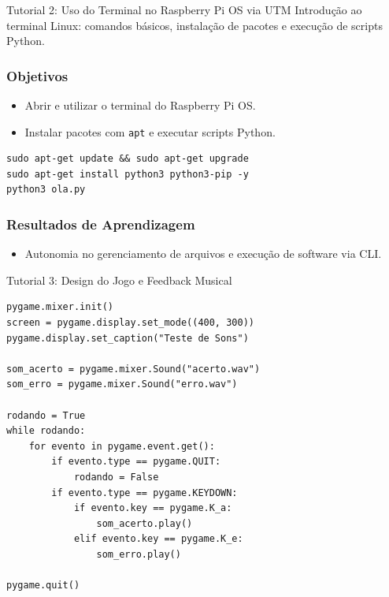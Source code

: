 \documentclass[11pt,a4paper]{article}
\begin{document}
    
\newpage  
\begin{boxTutorial}{Tutorial 2: Uso do Terminal no Raspberry Pi OS via UTM}
    \label{sec: Etapa 2: Uso do Terminal no Raspberry Pi OS via UTM}
        Introdução ao terminal Linux: comandos básicos, instalação de pacotes e execução de scripts Python.
        
        \subsubsection*{Objetivos}
        \begin{itemize}
            \item Abrir e utilizar o terminal do Raspberry Pi OS.
            \item Instalar pacotes com \texttt{apt} e executar scripts Python.
        \end{itemize}
        
    \begin{verbatim}
sudo apt-get update && sudo apt-get upgrade
sudo apt-get install python3 python3-pip -y
python3 ola.py
    \end{verbatim}
        
        \subsubsection*{Resultados de Aprendizagem}
        \begin{itemize}
            \item Autonomia no gerenciamento de arquivos e execução de software via CLI.
        \end{itemize}
\end{boxTutorial}
    

\newpage

\begin{boxTutorial}{Tutorial 3: Design do Jogo e Feedback Musical}
\label{sec: Etapa 3: Design do Jogo e Feedback Musical}

    \begin{verbatim}
pygame.mixer.init()
screen = pygame.display.set_mode((400, 300))
pygame.display.set_caption("Teste de Sons")

som_acerto = pygame.mixer.Sound("acerto.wav")
som_erro = pygame.mixer.Sound("erro.wav")

rodando = True
while rodando:
    for evento in pygame.event.get():
        if evento.type == pygame.QUIT:
            rodando = False
        if evento.type == pygame.KEYDOWN:
            if evento.key == pygame.K_a:
                som_acerto.play()
            elif evento.key == pygame.K_e:
                som_erro.play()

pygame.quit()
    \end{verbatim}
\end{boxTutorial}
\end{document}
